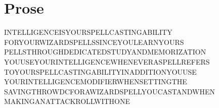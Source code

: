 \documentclass[letterpaper]{article}
\begin{document}
\section*{Prose}

{
    \Large \wizpenfont \noindent %
    INTELLIGENCEISYOURSPELLCASTINGABILITY \\
    FORYOURWIZARDSPELLSSINCEYOULEARNYOURS \\
    PELLSTHROUGHDEDICATEDSTUDYANDMEMORIZATION \\
    YOUUSEYOURINTELLIGENCEWHENEVERASPELLREFERS \\
    TOYOURSPELLCASTINGABILITYINADDITIONYOUUSE \\
    YOURINTELLIGENCEMODIFIERWHENSETTINGTHE \\
    SAVINGTHROWDCFORAWIZARDSPELLYOUCASTANDWHEN \\
    MAKINGANATTACKROLLWITHONE \\
}
\end{document}

